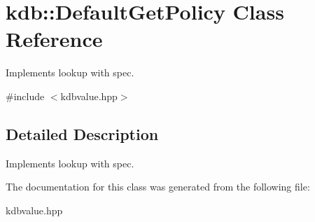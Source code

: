 \hypertarget{classkdb_1_1DefaultGetPolicy}{\section{kdb\+:\+:Default\+Get\+Policy Class Reference}
\label{classkdb_1_1DefaultGetPolicy}
}


Implements lookup with spec.  




{\ttfamily \#include $<$kdbvalue.\+hpp$>$}



\subsection{Detailed Description}
Implements lookup with spec. 

The documentation for this class was generated from the following file\+:\begin{DoxyCompactItemize}
\item 
kdbvalue.\+hpp\end{DoxyCompactItemize}
